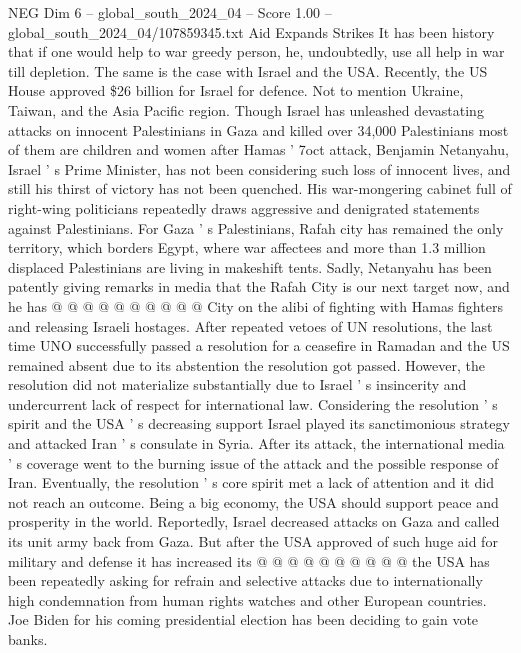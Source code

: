 \begin{textsample}{NEG Dim 6 – global\_south\_2024\_04 – Score 1.00 – global\_south\_2024\_04/107859345.txt}  \label{ex:f6_neg_361}
Aid Expands Strikes It has been history that if one would help to war greedy person, he, undoubtedly, use all help in war till depletion.
The same is the case with Israel and the USA.
Recently, the US House approved \$26 billion for Israel for defence.
Not to mention Ukraine, Taiwan, and the Asia Pacific region.
Though Israel has unleashed devastating attacks on innocent Palestinians in Gaza and killed over 34,000 Palestinians most of them are children and women after Hamas ' 7oct attack, Benjamin Netanyahu, Israel ' s Prime Minister, has not been considering such loss of innocent lives, and still his thirst of victory has not been quenched.
His war-mongering cabinet full of right-wing politicians repeatedly draws aggressive and denigrated statements against Palestinians.
For Gaza ' s Palestinians, Rafah city has remained the only territory, which borders Egypt, where war affectees and more than 1.3 million displaced Palestinians are living in makeshift tents.
Sadly, Netanyahu has been patently giving remarks in media that the Rafah City is our next target now, and he has @ @ @ @ @ @ @ @ @ @ City on the alibi of fighting with Hamas fighters and releasing Israeli hostages.
After repeated vetoes of UN resolutions, the last time UNO successfully passed a resolution for a ceasefire in Ramadan and the US remained absent due to its abstention the resolution got passed.
However, the resolution did not materialize substantially due to Israel ' s insincerity and undercurrent lack of respect for international law.
Considering the resolution ' s spirit and the USA ' s decreasing support Israel played its sanctimonious strategy and attacked Iran ' s consulate in Syria.
After its attack, the international media ' s coverage went to the burning issue of the attack and the possible response of Iran.
Eventually, the resolution ' s core spirit met a lack of attention and it did not reach an outcome.
Being a big economy, the USA should support peace and prosperity in the world.
Reportedly, Israel decreased attacks on Gaza and called its unit army back from Gaza.
But after the USA approved of such huge aid for military and defense it has increased its @ @ @ @ @ @ @ @ @ @ the USA has been repeatedly asking for refrain and selective attacks due to internationally high condemnation from human rights watches and other European countries.
Joe Biden for his coming presidential election has been deciding to gain vote banks.

\end{textsample}
